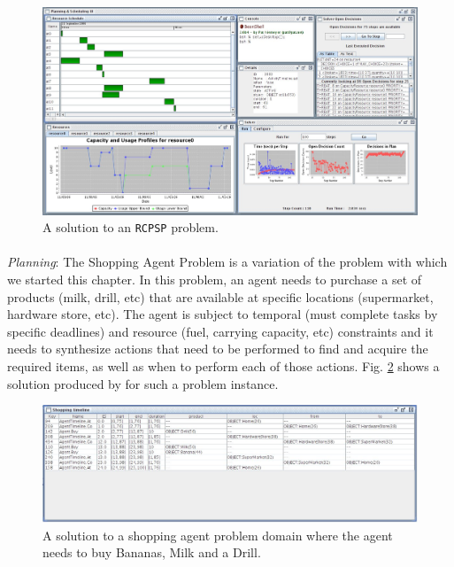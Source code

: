 {\begin{figure}
\centering
\includegraphics[scale=0.25]{figs/Example-UBO0.jpg}
\caption{\small A \eu solution to an \texttt{RCPSP} \cite{Bruckera99}
  problem.}
\label{fig:rcpsp-1}
\end{figure}


\paragraph{} \textit{Planning}: The Shopping Agent Problem
\cite{russelnorvig} is a variation of the problem with which we
started this chapter.  In this problem, an agent needs to purchase a
set of products (milk, drill, etc) that are available at specific
locations (supermarket, hardware store, etc). The agent is subject to
temporal (must complete tasks by specific deadlines) and resource
(fuel, carrying capacity, etc) constraints and it needs to synthesize
actions that need to be performed to find and acquire the required
items, as well as when to perform each of those actions.
Fig. \ref{fig:shopping-1} shows a solution produced by \eu for such a
problem instance.

\begin{figure}
\centering
\includegraphics[scale=0.3]{figs/Example-Shopping0.jpg}
\caption{\small A \eu solution to a shopping agent problem domain where
  the agent needs to buy Bananas, Milk and a Drill.}
\label{fig:shopping-1}
\end{figure}

}
